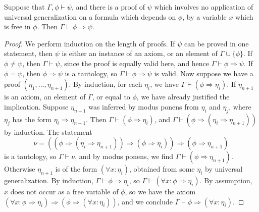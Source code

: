 \begin{theorem}
    Suppose that $\Gamma, \phi \vdash \psi$, and there is a proof of $\psi$ which involves no application of universal generalization on a formula which depends on $\phi$, by a variable $x$ which is free in $\phi$. Then $\Gamma \vdash \phi \Rightarrow \psi$.
\end{theorem}
\begin{proof}
    We perform induction on the length of proofs. If $\psi$ can be proved in one statement, then $\psi$ is either an instance of an axiom, or an element of $\Gamma \cup \{ \phi \}$. If $\phi \neq \psi$, then $\Gamma \vdash \psi$,  since the proof is equally valid here, and hence $\Gamma \vdash \phi \Rightarrow \psi$. If $\phi = \psi$, then $\phi \Rightarrow \psi$ is a tautology, so $\Gamma \vdash \phi \Rightarrow \psi$ is valid. Now suppose we have a proof $(\eta_1, \dots, \eta_{n+1})$. By induction, for each $\eta_i$, we have $\Gamma \vdash (\phi \Rightarrow \eta_i)$. If $\eta_{n+1}$ is an axiom, an element of $\Gamma$, or equal to $\phi$, we have already justified the implication. Suppose $\eta_{n+1}$ was inferred by modus ponens from $\eta_i$ and $\eta_j$, where $\eta_j$ has the form $\eta_i \Rightarrow \eta_{n+1}$. Then $\Gamma \vdash (\phi \Rightarrow \eta_i)$, and $\Gamma \vdash (\phi \Rightarrow (\eta_i \Rightarrow \eta_{n+1}))$ by induction. The statement
    \[ \nu = ((\phi \Rightarrow (\eta_i \Rightarrow \eta_{n+1})) \Rightarrow (\phi \Rightarrow \eta_i)) \Rightarrow (\phi \Rightarrow \eta_{n+1}) \]
    is a tautology, so $\Gamma \vdash \nu$, and by modus ponens, we find $\Gamma \vdash (\phi \Rightarrow \eta_{n+1})$. Otherwise $\eta_{n+1}$ is of the form $(\forall x: \eta_i)$, obtained from some $\eta_i$ by universal generalization. By induction, $\Gamma \vdash \phi \Rightarrow \eta_i$, so $\Gamma \vdash (\forall x: \phi \Rightarrow \eta_i)$. By assumption, $x$ does not occur as a free variable of $\phi$, so we have the axiom $(\forall x: \phi \Rightarrow \eta_i) \Rightarrow (\phi \Rightarrow (\forall x: \eta_i))$, and we conclude $\Gamma \vdash \phi \Rightarrow (\forall x: \eta_i)$.
\end{proof}

